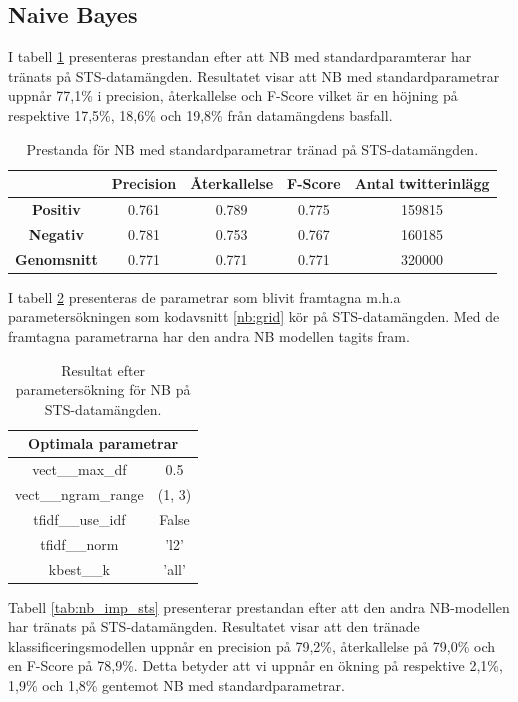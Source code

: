 \documentclass{kaumasters} %
\begin{document}
\subsection{Naive Bayes}
I tabell \ref{tab:nb_base_sts} presenteras prestandan efter att NB med standardparamterar har tränats på STS-datamängden. Resultatet visar att NB med standardparametrar uppnår 77,1\% i precision, återkallelse och F-Score vilket är en höjning på respektive 17,5\%, 18,6\% och 19,8\% från datamängdens basfall.

\begin{table}[H]
\centering
\caption{Prestanda för NB med standardparametrar tränad på STS-datamängden.}
\label{tab:nb_base_sts}
    \begin{tabular}{ccccc}
    \toprule
     & \textbf{Precision} & \textbf{Återkallelse} & \textbf{F-Score} & \textbf{Antal twitterinlägg}  \\
    \midrule
    \textbf{Positiv} & 0.761 & 0.789 & 0.775 & 159815 \\
    \textbf{Negativ} & 0.781 & 0.753 & 0.767 & 160185 \\
    \midrule
    \textbf{Genomsnitt} & 0.771 & 0.771 & 0.771  & 320000 \\
    \bottomrule
\end{tabular}
\end{table}

I tabell \ref{tab:nb_grid_sts} presenteras de parametrar som blivit framtagna m.h.a parametersökningen som kodavsnitt \ref{nb:grid} kör på STS-datamängden. Med de framtagna parametrarna har den andra NB modellen tagits fram. 

\begin{table}[H]
\centering
\caption{Resultat efter parametersökning för NB på STS-datamängden.}
\label{tab:nb_grid_sts}
    \begin{tabular}{cc}
    \toprule
    \multicolumn{2}{c}{\textbf{Optimala parametrar}} \\
    \midrule
    vect\_\_max\_df & 0.5  \\
    vect\_\_ngram\_range & (1, 3)  \\
    tfidf\_\_use\_idf & False  \\
    tfidf\_\_norm & 'l2'  \\
    kbest\_\_k & 'all' \\
    \bottomrule
\end{tabular}
\end{table}

Tabell \ref{tab:nb_imp_sts} presenterar prestandan efter att den andra NB-modellen har tränats på STS-datamängden. Resultatet visar att den tränade klassificeringsmodellen uppnår en precision på 79,2\%, återkallelse på 79,0\% och en F-Score på 78,9\%. Detta betyder att vi uppnår en ökning på respektive 2,1\%, 1,9\% och 1,8\% gentemot NB med standardparametrar. 
\end{document}
